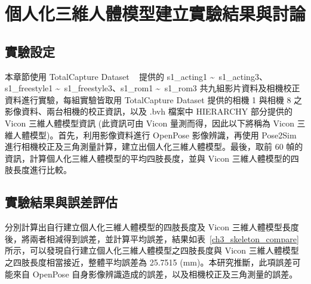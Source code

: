\clearpage

\section{個人化三維人體模型建立實驗結果與討論}\label{ch4_skeleton_exp}

\subsection{實驗設定}
本章節使用 TotalCapture Dataset ~\cite{Trumble:BMVC:2017} 提供的 s1\_acting1 \textasciitilde\ s1\_acting3、s1\_freestyle1 \textasciitilde\ s1\_freestyle3、s1\_rom1 \textasciitilde\ s1\_rom3 共九組影片資料及相機校正資料進行實驗，每組實驗皆取用 TotalCapture Dataset  提供的相機 1 與相機 8 之影像資料、兩台相機的校正資訊，以及 .bvh 檔案中 HIERARCHY 部分提供的 Vicon 三維人體模型資訊 (此資訊可由 Vicon 量測而得，因此以下將稱為 Vicon 三維人體模型)。首先，利用影像資料進行 OpenPose 影像辨識，再使用 Pose2Sim 進行相機校正及三角測量計算，建立出個人化三維人體模型。最後，取前 60 幀的資訊，計算個人化三維人體模型的平均四肢長度，並與 Vicon 三維人體模型的四肢長度進行比較。

\subsection{實驗結果與誤差評估}
分別計算出自行建立個人化三維人體模型的四肢長度及 Vicon 三維人體模型長度後，將兩者相減得到誤差，並計算平均誤差，結果如表~\ref{ch3_skeleton_compare} 所示，可以發現自行建立個人化三維人體模型之四肢長度與 Vicon 三維人體模型之四肢長度相當接近，整體平均誤差為 25.7515 (mm)。本研究推斷，此項誤差可能來自 OpenPose 自身影像辨識造成的誤差，以及相機校正及三角測量的誤差。

